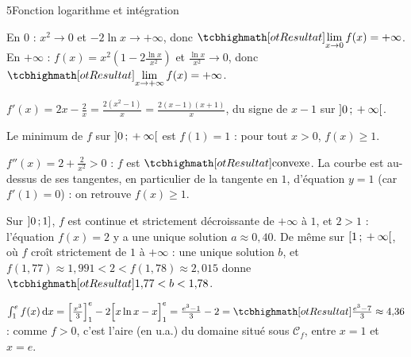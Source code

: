 \begin{corrigeBac}{5}{Fonction logarithme et intégration}
\begin{questions}
  \item En $0$ : $x^{2}\to0$ et $-2\ln x\to+\infty$, donc $\res{\lim\limits_{x\to0}f(x)=+\infty}$. En $+\infty$ :
    $f(x)=x^{2}\left(1-2\frac{\ln x}{x^{2}}\right)$ et $\frac{\ln x}{x^{2}}\to0$, donc $\res{\lim\limits_{x\to+\infty}f(x)=+\infty}$. \pts{1 pt}
  \item $f'(x)=2x-\frac2x=\frac{2(x^{2}-1)}{x}=\frac{2(x-1)(x+1)}{x}$, du signe de $x-1$ sur $\mathopen{]}0\,{;}\,+\infty\mathclose{[}$.
\begin{center}
\begin{tableau}
\end{tableau}
\end{center}
    \pts{1 pt}
  \item Le minimum de $f$ sur $\mathopen{]}0\,{;}\,+\infty\mathclose{[}$ est $f(1)=1$ : pour tout $x>0$, $f(x)\geq1$. 
  \item $f''(x)=2+\frac2{x^{2}}>0$ : $f$ est $\res{\text{convexe}}$. La courbe est au-dessus de ses tangentes, en particulier de la
    tangente en $1$, d'équation $y=1$ (car $f'(1)=0$) : on retrouve $f(x)\geq1$. 
\end{questions}
\begin{questions}[resume]
  \item Sur $\mathopen{]}0\,{;}\,1\mathclose{]}$, $f$ est continue et strictement décroissante de $+\infty$ à $1$, et $2>1$ : l'équation $f(x)=2$ y a une unique
    solution $a\approx0{,}40$. De même sur $\mathopen{[}1\,{;}\,+\infty\mathclose{[}$, où $f$ croît strictement de $1$ à $+\infty$ : une unique solution $b$, et
    $f(1{,}77)\approx1{,}991<2<f(1{,}78)\approx2{,}015$ donne $\res{1{,}77<b<1{,}78}$. \pts{1 pt}
  \item $\int_1^{e}f(x)\,\mathrm{d}x=\left[\frac{x^{3}}{3}\right]_1^{e}-2\Big[x\ln x-x\Big]_1^{e}=\frac{e^{3}-1}{3}-2
    =\res{\tfrac{e^{3}-7}{3}}\approx4{,}36$ : comme $f>0$, c'est l'aire (en u.a.) du domaine situé sous $\mathcal{C}_f$, entre $x=1$ et
    $x=e$. \pts{1 pt}
\end{questions}
\end{corrigeBac}
